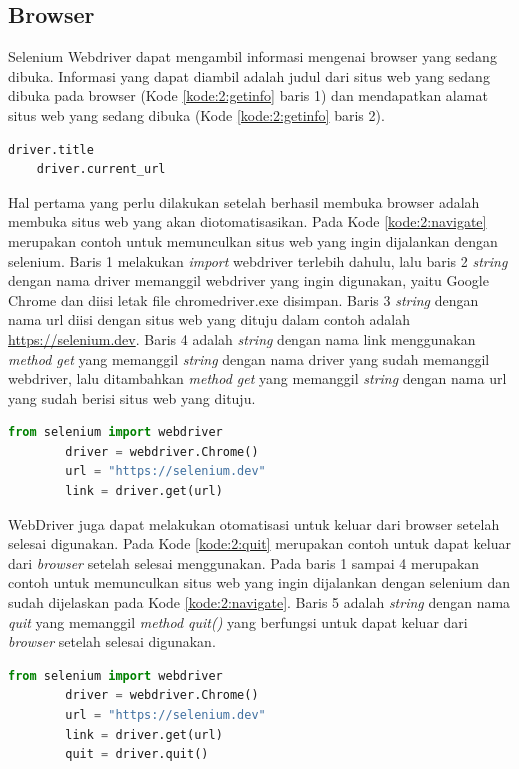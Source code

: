 \subsection{Browser}
Selenium Webdriver dapat mengambil informasi mengenai browser yang sedang dibuka. Informasi yang dapat diambil adalah judul dari situs web yang sedang dibuka pada browser (Kode \ref{kode:2:getinfo} baris 1) dan mendapatkan alamat situs web yang sedang dibuka (Kode \ref{kode:2:getinfo} baris 2). 
\begin{lstlisting}[language=python, caption=Contoh Potongan Kode \textit{Get Title} dan \textit{Get Current URL}, label=kode:2:getinfo]
	driver.title
	driver.current_url
\end{lstlisting}
Hal pertama yang perlu dilakukan setelah berhasil membuka browser adalah membuka situs web yang akan diotomatisasikan. Pada Kode \ref{kode:2:navigate} merupakan contoh untuk memunculkan situs web yang ingin dijalankan dengan selenium. Baris 1 melakukan \textit{import} webdriver terlebih dahulu, lalu baris 2 \textit{string} dengan nama driver memanggil webdriver yang ingin digunakan, yaitu Google Chrome dan diisi letak file chromedriver.exe disimpan. Baris 3 \textit{string} dengan nama url diisi dengan situs web yang dituju dalam contoh adalah \url{https://selenium.dev}. Baris 4 adalah \textit{string} dengan nama link menggunakan \textit{method get} yang memanggil \textit{string} dengan nama driver yang sudah memanggil webdriver, lalu ditambahkan \textit{method get} yang memanggil \textit{string} dengan nama url yang sudah berisi situs web yang dituju.\\
	\begin{lstlisting}[language=python, caption=Contoh kode Navigate to, label=kode:2:navigate]
		from selenium import webdriver
		driver = webdriver.Chrome()
		url = "https://selenium.dev"
		link = driver.get(url)
	\end{lstlisting}
WebDriver juga dapat melakukan otomatisasi untuk keluar dari browser setelah selesai digunakan. Pada Kode \ref{kode:2:quit} merupakan contoh untuk dapat keluar dari \textit{browser} setelah selesai menggunakan. Pada baris 1 sampai 4 merupakan contoh untuk memunculkan situs web yang ingin dijalankan dengan selenium dan sudah dijelaskan pada Kode \ref{kode:2:navigate}. Baris 5 adalah \textit{string} dengan nama \textit{quit} yang memanggil \textit{method quit()} yang berfungsi untuk dapat keluar dari \textit{browser} setelah selesai digunakan.
	\begin{lstlisting}[language=python, caption=Contoh kode Get title, label=kode:2:quit]
		from selenium import webdriver
		driver = webdriver.Chrome()
		url = "https://selenium.dev"
		link = driver.get(url)
		quit = driver.quit()
	\end{lstlisting}

